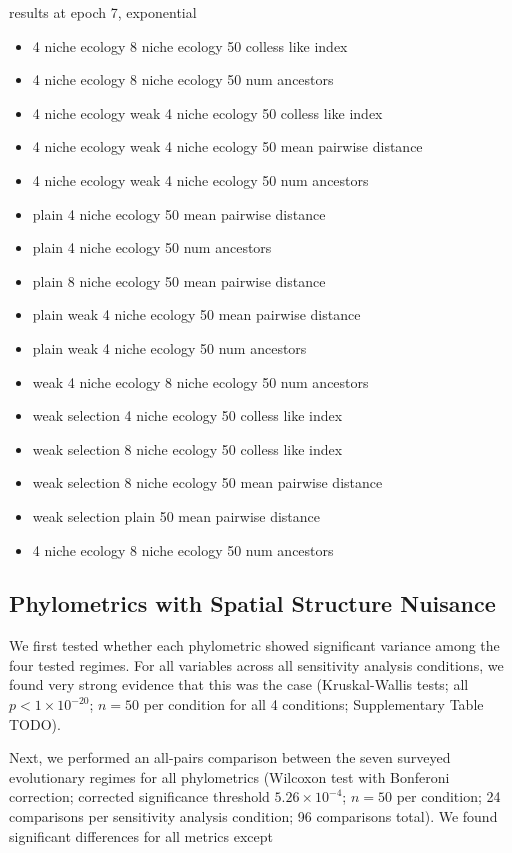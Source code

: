 results at epoch 7, exponential
    \begin{itemize}
        \item 4 niche ecology	8 niche ecology	50	colless like index
        \item 4 niche ecology	8 niche ecology	50	num ancestors
        \item 4 niche ecology	weak 4 niche ecology	50	colless like index
        \item 4 niche ecology	weak 4 niche ecology	50	mean pairwise distance
        \item 4 niche ecology	weak 4 niche ecology	50	num ancestors
        \item plain	4 niche ecology	50	mean pairwise distance
        \item plain	4 niche ecology	50	num ancestors
        \item plain	8 niche ecology	50	mean pairwise distance
        \item plain	weak 4 niche ecology	50	mean pairwise distance
        \item plain	weak 4 niche ecology	50	num ancestors
        \item weak 4 niche ecology	8 niche ecology	50	num ancestors
        \item weak selection	4 niche ecology	50	colless like index
        \item weak selection	8 niche ecology	50	colless like index
        \item weak selection	8 niche ecology	50	mean pairwise distance
        \item weak selection	plain	50	mean pairwise distance
        \item 4 niche ecology	8 niche ecology	50	num ancestors

    \end{itemize}
\subsection{Phylometrics with Spatial Structure Nuisance}

We first tested whether each phylometric showed significant variance among the four tested regimes. For all variables across all sensitivity analysis conditions, we found very strong evidence that this was the case (Kruskal-Wallis tests; all $p < 1\times10^{-20}$; $n=50$ per condition for all 4 conditions; Supplementary Table TODO).

Next, we performed an all-pairs comparison between the seven surveyed evolutionary regimes for all phylometrics (Wilcoxon test with Bonferoni correction; corrected significance threshold $5.26 \times 10^{-4}$; $n=50$ per condition; 24 comparisons per sensitivity analysis condition; 96 comparisons total). We found significant differences for all metrics except

